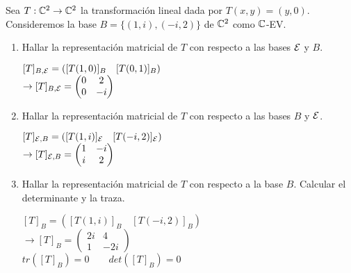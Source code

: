 \item Sea $T:\mathbb{C}^2\to\mathbb{C}^2$ la transformación lineal dada por $T(x,y)=(y,0)$. Consideremos la base $B=\{(1,i),(-i,2)\}$ de $\mathbb{C}^2$ como $\mathbb{C}$-EV.
    \begin{enumerate}
        \item Hallar la representación matricial de $T$ con respecto a las bases $\mathcal{E}$ y $B$.\pagebreak
            \begin{mdframed}[style=s]
                \begin{center}
                    $[T]_{B,\mathcal{E}}=\left([T(1,0)]_B\quad[T(0,1)]_B\right)$\\
                    $\to [T]_{B,\mathcal{E}}=\begin{pmatrix}
                        0&2\\0&-i
                    \end{pmatrix}$
                \end{center}
            \end{mdframed}
        \item Hallar la representación matricial de $T$ con respecto a las bases $B$ y $\mathcal{E}$.
            \begin{mdframed}[style=s]
                \begin{center}
                    $[T]_{\mathcal{E},B}=\left([T(1,i)]_{\mathcal{E}}\quad[T(-i,2)]_{\mathcal{E}}\right)$\\
                    $\to [T]_{\mathcal{E},B}=\begin{pmatrix}
                        1&-i\\i&2
                    \end{pmatrix}$
                \end{center}
            \end{mdframed}
        \item Hallar la representación matricial de $T$ con respecto a la base $B$. Calcular el determinante y la traza.
            \begin{mdframed}[style=s]
                \begin{center}
                    $[T]_B=\left([T(1,i)]_B\quad[T(-i,2)]_B\right)$\\
                    $\to [T]_B=\begin{pmatrix}
                        2i&4\\1&-2i
                    \end{pmatrix}$\\
                    $tr([T]_B)=0\qquad det([T]_B)=0$
                \end{center}

\end{mdframed}
\end{enumerate}
